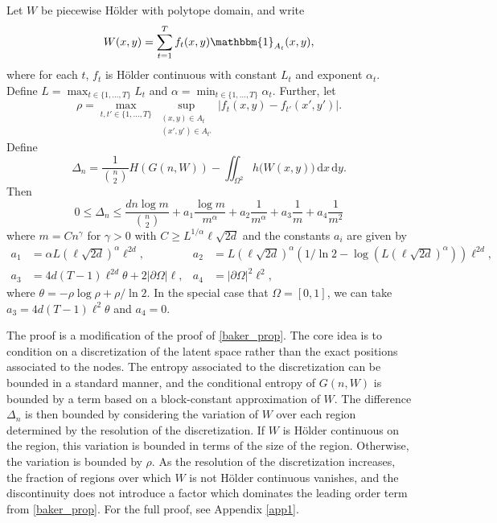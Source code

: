 \documentclass{svproc}
\newcommand{\1}{\mathbbm{1}}
\newcommand{\K}{\Omega}
\newcommand{\set}[1]{\{ #1\}}
\newcommand{\dd}{\,\mathrm{d}}
\begin{document}
\begin{proposition}\label{prop1}
Let $W$ be piecewise H\"{o}lder with polytope domain, and write
\[W(x,y) = \sum_{t=1}^T f_t(x,y) \1_{A_t}(x,y),\]
where for each $t$, $f_t$ is H\"{o}lder continuous with constant $L_t$ and exponent $\alpha_t$. Define $L=\max_{t\in\set{1,\dots,T}}L_t$ and $\alpha = \min_{t\in\set{1,\dots,T}}\alpha_t$. Further, let 
\begin{equation}\rho = \max_{t,t'\in\set{1,\dots,T}}\sup_{\substack{(x,y)\in A_t\\ (x',y')\in A_{t'}}}|f_t(x,y)-f_{t'}(x',y')|.\end{equation}
Define
\[\Delta_n = \frac{1}{\binom n2}H(G(n,W)) - \iint_{\Omega^2}h\big(W(x,y)\big)\dd x\dd y.\]
Then
\begin{equation}0\leq\Delta_n\leq\frac{dn\log m}{\binom n2} +a_1 \frac{\log m}{m^\alpha}+a_2 \frac{1}{m^\alpha}+a_3\frac{1}{m}+a_4\frac{1}{m^2}\end{equation}
where $m = Cn^\gamma$ for $\gamma>0$ with $C\geq L^{1/\alpha}\ell\sqrt{2d}$ and the constants $a_i$ are given by 
\begin{align*}
a_1 &= \alpha L (\ell\sqrt{2d})^{\alpha}\ell^{2d}, & a_2 &=L(\ell\sqrt{2d})^{\alpha}(1/\ln 2 - \log(L(\ell\sqrt{2d})^{\alpha}))\ell^{2d},\\
a_3 &= 4d(T-1)\ell^{2d}\theta+2|\partial\K|\ell, & a_4 &= |\partial\K|^2\ell^2,
\end{align*}
where $\theta = -\rho\log\rho+\rho/\ln 2$. In the special case that $\Omega = [0,1]$, we can take $a_3 = 4d(T-1)\ell^{2}\theta$ and $a_4 = 0$.
\end{proposition}

The proof is a modification of the proof of \cref{baker_prop}. The core idea is to condition on a discretization of the latent space rather than the exact positions associated to the nodes. The entropy associated to the discretization can be bounded in a standard manner, and the conditional entropy of $G(n,W)$ is bounded by a term based on a block-constant approximation of $W$. The difference $\Delta_n$ is then bounded by considering the variation of $W$ over each region determined by the resolution of the discretization. If $W$ is H\"{o}lder continuous on the region, this variation is bounded in terms of the size of the region. Otherwise, the variation is bounded by $\rho$. As the resolution of the discretization increases, the fraction of regions over which $W$ is not H\"{o}lder continuous vanishes, and the discontinuity does not introduce a factor which dominates the leading order term from \cref{baker_prop}. For the full proof, see Appendix \ref{app1}.
\end{document}

